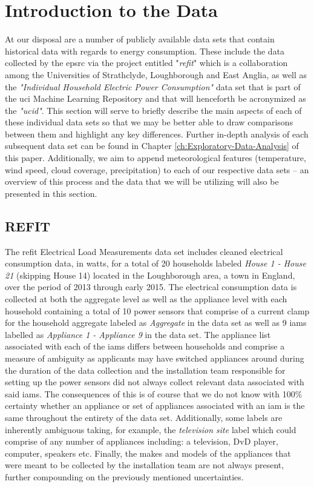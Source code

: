 \section{Introduction to the Data}
\label{sec:Introduction:Introduction-to-the-Data}
At our disposal are a number of publicly available data sets that contain historical data with regards to energy consumption. These include the data collected by the \gls{epsrc} via the project entitled "\textit{\gls{refit}}" \cite{REFIT} which is a collaboration among the Universities of Strathclyde, Loughborough and East Anglia, as well as the \textit{"Individual Household Electric Power Consumption"} data set \cite{UCID} that is part of the \gls{uci} Machine Learning Repository and that will henceforth be acronymized as the \textit{"\gls{ucid}"}. This section will serve to briefly describe the main aspects of each of these individual data sets so that we may be better able to draw comparisons between them and highlight any key differences. Further in-depth analysis of each subsequent data set can be found in Chapter \ref{ch:Exploratory-Data-Analysis} of this paper. Additionally, we aim to append meteorological features (\eg temperature, wind speed, cloud coverage, precipitation) to each of our respective data sets -- an overview of this process and the data that we will be utilizing will also be presented in this section.

\subsection{REFIT}
\label{subsec:Introduction:Introduction-to-the-Data:REFIT}
The \gls{refit} Electrical Load Measurements data set \cite{REFIT} includes cleaned electrical consumption data, in watts, for a total of 20 households labeled \textit{House 1 - House 21} (skipping House 14) located in the Loughborough area, a town in England, over the period of 2013 through early 2015. The electrical consumption data is collected at both the aggregate level as well as the appliance level with each household containing a total of 10 power sensors that comprise of a current clamp for the household aggregate labeled as \textit{Aggregate} in the data set as well as 9 \glspl{iam} labelled as \textit{Appliance 1 - Appliance 9} in the data set. The appliance list associated with each of the \glspl{iam} differs between households and comprise a measure of ambiguity as applicants may have switched appliances around during the duration of the data collection and the installation team responsible for setting up the power sensors did not always collect relevant data associated with said \glspl{iam}. The consequences of this is of course that we do not know with 100\% certainty whether an appliance or set of appliances associated with an \gls{iam} is the same throughout the entirety of the data set. Additionally, some labels are inherently ambiguous taking, for example, the \textit{television site} label which could comprise of any number of appliances including: a television, DvD player, computer, speakers etc. Finally, the makes and models of the appliances that were meant to be collected by the installation team are not always present, further compounding on the previously mentioned uncertainties.


